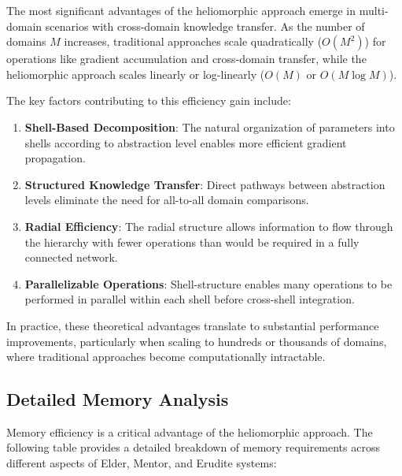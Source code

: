 The most significant advantages of the heliomorphic approach emerge in multi-domain scenarios with cross-domain knowledge transfer. As the number of domains $M$ increases, traditional approaches scale quadratically ($O(M^2)$) for operations like gradient accumulation and cross-domain transfer, while the heliomorphic approach scales linearly or log-linearly ($O(M)$ or $O(M \log M)$).

The key factors contributing to this efficiency gain include:

\begin{enumerate}
    \item \textbf{Shell-Based Decomposition}: The natural organization of parameters into shells according to abstraction level enables more efficient gradient propagation.
    
    \item \textbf{Structured Knowledge Transfer}: Direct pathways between abstraction levels eliminate the need for all-to-all domain comparisons.
    
    \item \textbf{Radial Efficiency}: The radial structure allows information to flow through the hierarchy with fewer operations than would be required in a fully connected network.
    
    \item \textbf{Parallelizable Operations}: Shell-structure enables many operations to be performed in parallel within each shell before cross-shell integration.
\end{enumerate}

In practice, these theoretical advantages translate to substantial performance improvements, particularly when scaling to hundreds or thousands of domains, where traditional approaches become computationally intractable.

\subsection{Detailed Memory Analysis}

Memory efficiency is a critical advantage of the heliomorphic approach. The following table provides a detailed breakdown of memory requirements across different aspects of Elder, Mentor, and Erudite systems:


